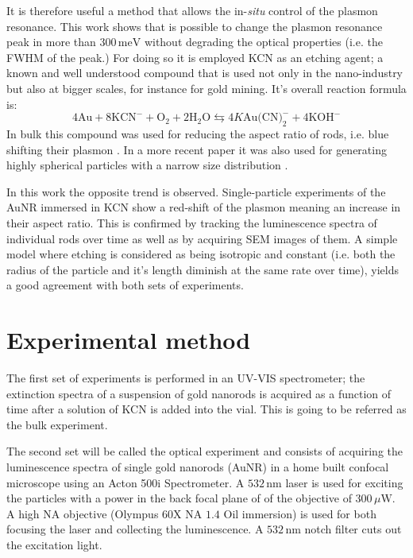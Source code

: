 \documentclass[twocolumn]{article}
\begin{document}
It is therefore useful a method that allows the in-\textit{situ} control of the
plasmon resonance. This work shows that is possible to change the plasmon
resonance peak in more than $300\,\textrm{meV}$ without degrading the optical
properties (i.e. the FWHM of the peak.) For doing so it is employed KCN as an
etching agent; a known and well understood compound that is used not only in the
nano-industry but also at bigger scales, for instance for gold mining. It's
overall reaction formula is:
\begin{equation*}
4\textrm{Au} + 8\textrm{KCN}^-+\textrm{O}_2 + 2\textrm{H}_2\textrm{O}
\leftrightarrows 4K\textrm{Au(CN)}_2^-+4\textrm{KOH}^-
\end{equation*}
In bulk this compound was used for reducing the aspect ratio of rods, i.e.
blue shifting their plasmon \cite{Jana2002}. In a more recent paper it was also
used for generating highly spherical particles with a narrow size
distribution \cite{Lee2013}.

In this work the opposite trend is observed. Single-particle experiments of the
AuNR immersed in KCN show a red-shift of the plasmon meaning an increase in
their aspect ratio. This is confirmed by tracking the luminescence spectra of
individual rods over time as well as by acquiring SEM images of them. A simple
model where etching is considered as being isotropic and constant (i.e. both the
radius of the particle and it's length diminish at the same rate over time),
yields a good agreement with both sets of experiments.

\section{Experimental method}
The first set of experiments is performed in an UV-VIS spectrometer; the
extinction spectra of a suspension of gold nanorods is acquired as a function of
time after a solution of KCN is added into the vial. This is going to be
referred as the bulk experiment.

The second set will be called the optical experiment and consists of acquiring
the luminescence spectra of single gold nanorods (AuNR) in a home built confocal
microscope using an Acton 500i Spectrometer. A $532\,\textrm{nm}$ laser is used
for exciting the particles with a power in the back focal plane of of the
objective of $300\,\mu\textrm{W}$. A high NA objective (Olympus $60$X NA $1.4$
Oil immersion) is used for both focusing the laser and collecting the
luminescence. A $532\,\textrm{nm}$ notch filter cuts out the excitation light.
\end{document}
